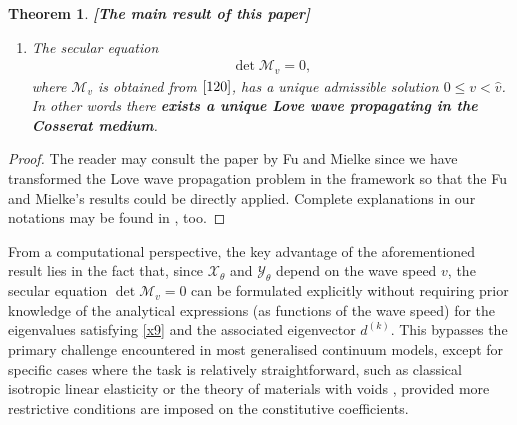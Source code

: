 \documentclass[10pt]{article}
\newcommand{\tr}{{\rm tr}}
\newtheorem{theorem}{Theorem}[section]
\begin{document}
\begin{theorem}{\rm {\bf [The main result of this paper]}}
\begin{enumerate}
\begin{enumerate}
 			\item $  \boldsymbol{\mathcal{M}}_v$ is hermitian,
 			\item  $\frac{d  {  \boldsymbol{\mathcal{M}}}_v}{d v}$ is negative definite,
 			\item  $\tr(  {  \boldsymbol{\mathcal{M}}}_v)\geq 0$, and $\langle  w,  {  \boldsymbol{\mathcal{M}}}_v\,w\rangle \geq 0$ for all real vectors $w$ for  all $0\leq v\leq  \widehat{v}$,
 			\item $  \boldsymbol{\mathcal{M}}_v$ is  positive definite.
 		\end{enumerate}
 		\item The secular equation
 		\begin{align}\label{secularEq}
 			\det  {  \boldsymbol{\mathcal{M}}}_v=0,
 		\end{align}
 		where $  \boldsymbol{\mathcal{M}}_v$ is obtained from $\eqref{120}$, has a unique admissible solution $0\leq v<\widehat{v}$. In other words there {\bf exists a unique Love wave propagating in the Cosserat medium}.
 	\end{enumerate}
 \end{theorem}
 
 
 \begin{proof}
 	The reader may consult the paper by Fu and Mielke \cite{fu2002new}  since we have transformed the Love wave propagation problem in the framework  {so that} the  Fu and Mielke's results could be directly applied. Complete explanations in our notations may be found in \cite{khan2022existence}, too.
 \end{proof}
 
 From a computational perspective, the key advantage of the aforementioned result lies in the fact that, since $\boldsymbol{\mathcal{X}}_{\theta}$ and $\boldsymbol{\mathcal{Y}}_{\theta}$ depend on the wave speed $v$, the secular equation $\det \boldsymbol{\mathcal{M}}_v=0$ can be formulated explicitly without requiring prior knowledge of the analytical expressions (as functions of the wave speed) for the eigenvalues satisfying \eqref{x9} and the associated eigenvector $d^{(k)}$. This bypasses the primary challenge encountered in most generalised  {continuum} models, except for specific cases where the task is relatively straightforward, such as classical isotropic linear elasticity \cite{Achenbach} or the theory of materials with voids \cite{NunziatoCowin79,ChiritaGhiba2,straughan2008stability}, provided more restrictive conditions are imposed on the constitutive coefficients. 
\end{document}
